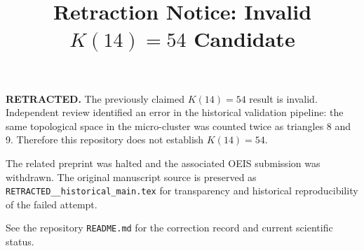 \documentclass[11pt]{article}
\title{Retraction Notice: Invalid \(K(14)=54\) Candidate}
\author{}
\date{}
\begin{document}
\maketitle

\textbf{RETRACTED.} The previously claimed \(K(14)=54\) result is invalid.
Independent review identified an error in the historical validation pipeline:
the same topological space in the micro-cluster was counted twice as triangles
8 and 9. Therefore this repository does not establish \(K(14)=54\).

The related preprint was halted and the associated OEIS submission was
withdrawn. The original manuscript source is preserved as
\texttt{RETRACTED\_\_historical\_main.tex} for transparency and historical
reproducibility of the failed attempt.

See the repository \texttt{README.md} for the correction record and current
scientific status.
\end{document}
